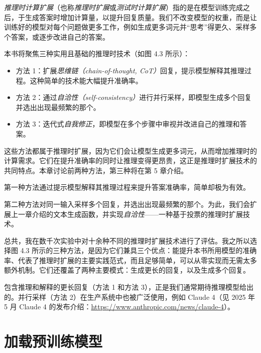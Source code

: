 \emph{推理时计算扩展}（也称\emph{推理时扩展}或\emph{测试时计算扩展}）指的是在模型训练完成之后，于生成答案时增加计算量，以提升回复质量。我们不改变模型的权重，而是让训练好的模型对每个问题做更多工作，例如生成更多词元并“思考”得更久、采样多个答案，或逐步改进自己的答案。

本书将聚焦三种实用且基础的推理时技术（如图 4.3 所示）：

\begin{itemize}
\item 方法 1：扩展\emph{思维链（chain-of-thought, CoT）}回复，提示模型解释其推理过程。这种简单的技术能大幅提升准确率。
\item 方法 2：通过\emph{自洽性（self-consistency）}进行并行采样，即模型生成多个回复并选出出现最频繁的那个。
\item 方法 3：迭代式\emph{自我修正}，即模型在多个步骤中审视并改进自己的推理和答案。
\end{itemize}

这些方法都属于推理时扩展，因为它们会让模型生成更多词元，从而增加推理时的计算需求。它们在提升准确率的同时让推理变得更昂贵，这正是推理时扩展技术的共同特点。本章讨论前两种方法，第三种将在第 5 章介绍。

第一种方法通过提示模型解释其推理过程来提升答案准确率，简单却极为有效。

第二种方法对同一输入采样多个回复，并选出出现最频繁的那个。为此，我们会扩展上一章介绍的文本生成函数，并实现\emph{自洽性}——一种基于投票的推理时扩展技术。

总共，我在数千次实验中对十余种不同的推理时扩展技术进行了评估。我之所以选择图 4.3 所示的三种方法，是因为它们兼具三个优点：能提升本书所用模型的准确率、代表了推理时扩展的主要实践范式，而且足够简单，可以从零实现而无需太多额外机制。它们还覆盖了两种主要模式：生成更长的回复，以及生成多个回复。


包含推理和解释的更长回复（方法 1 和方法 3），正是我们通常期待推理模型给出的。并行采样（方法 2）在生产系统中也被广泛使用，例如 Claude 4（见 2025 年 5 月 Claude 4 的发布介绍：\href{https://www.anthropic.com/news/claude-4}{https://www.anthropic.com/news/claude-4}）。

\section{加载预训练模型}

